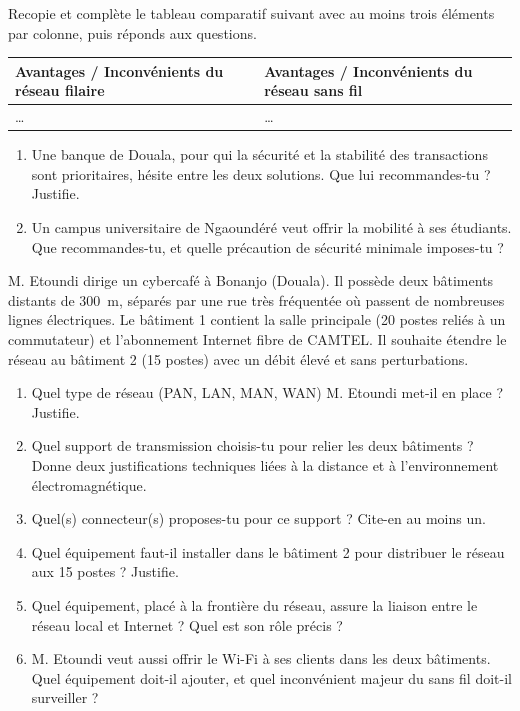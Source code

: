\documentclass[11pt]{article}
\newcommand{\cle}[1]{{\popxbold\color{popdark}#1}}
\newcounter{popsec}
\newcounter{popsub}
\newcommand{\courssub}[1]{%
  \stepcounter{popsub}%
  \par\vspace{9pt}\noindent{\popxbold\fontsize{11.5}{13}\selectfont\color{popink}{\color{poporange}\thepopsec.\thepopsub}\hspace{6pt}#1}\par\nopagebreak\vspace{4pt}
}
\begin{document}
\begin{exercice}
Recopie et complète le tableau comparatif suivant avec au moins trois éléments par colonne, puis réponds aux questions.
\begin{center}
\begin{tabularx}{\linewidth}{|X|X|}
\hline
\rowcolor{popblueL} \textbf{Avantages / Inconvénients du réseau filaire} & \textbf{Avantages / Inconvénients du réseau sans fil} \\
\hline
\ldots & \ldots \\
\hline
\end{tabularx}
\end{center}
\begin{enumerate}
  \item Une banque de Douala, pour qui la \cle{sécurité} et la \cle{stabilité} des transactions sont prioritaires, hésite entre les deux solutions. Que lui recommandes-tu ? Justifie.
  \item Un campus universitaire de Ngaoundéré veut offrir la \cle{mobilité} à ses étudiants. Que recommandes-tu, et quelle précaution de sécurité minimale imposes-tu ?
\end{enumerate}
\end{exercice}

\courssub{Je me prépare au Bac}

\begin{exercice}
M. Etoundi dirige un cybercafé à Bonanjo (Douala). Il possède deux bâtiments distants de \SI{300}{m}, séparés par une rue très fréquentée où passent de nombreuses lignes électriques. Le bâtiment 1 contient la salle principale (20 postes reliés à un commutateur) et l'abonnement Internet fibre de CAMTEL. Il souhaite étendre le réseau au bâtiment 2 (15 postes) avec un débit élevé et sans perturbations.
\begin{enumerate}
  \item Quel type de réseau (PAN, LAN, MAN, WAN) M. Etoundi met-il en place ? Justifie.
  \item Quel support de transmission choisis-tu pour relier les deux bâtiments ? Donne deux justifications techniques liées à la distance et à l'environnement électromagnétique.
  \item Quel(s) connecteur(s) proposes-tu pour ce support ? Cite-en au moins un.
  \item Quel équipement faut-il installer dans le bâtiment 2 pour distribuer le réseau aux 15 postes ? Justifie.
  \item Quel équipement, placé à la frontière du réseau, assure la liaison entre le réseau local et Internet ? Quel est son rôle précis ?
  \item M. Etoundi veut aussi offrir le Wi-Fi à ses clients dans les deux bâtiments. Quel équipement doit-il ajouter, et quel inconvénient majeur du sans fil doit-il surveiller ?
\end{enumerate}
\end{exercice}
\end{document}
